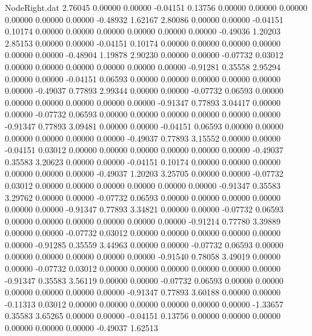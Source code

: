 \begin{filecontents}{NodeRight.dat}
   2.76045    0.00000    0.00000    -0.04151    0.13756    0.00000    0.00000    0.00000    0.00000    0.00000    0.00000   -0.48932    1.62167
   2.80086    0.00000    0.00000    -0.04151    0.10174    0.00000    0.00000    0.00000    0.00000    0.00000    0.00000   -0.49036    1.20203
   2.85153    0.00000    0.00000    -0.04151    0.10174    0.00000    0.00000    0.00000    0.00000    0.00000    0.00000   -0.48904    1.19878
   2.90230    0.00000    0.00000    -0.07732    0.03012    0.00000    0.00000    0.00000    0.00000    0.00000    0.00000   -0.91281    0.35558
   2.95294    0.00000    0.00000    -0.04151    0.06593    0.00000    0.00000    0.00000    0.00000    0.00000    0.00000   -0.49037    0.77893
   2.99344    0.00000    0.00000    -0.07732    0.06593    0.00000    0.00000    0.00000    0.00000    0.00000    0.00000   -0.91347    0.77893
   3.04417    0.00000    0.00000    -0.07732    0.06593    0.00000    0.00000    0.00000    0.00000    0.00000    0.00000   -0.91347    0.77893
   3.09481    0.00000    0.00000    -0.04151    0.06593    0.00000    0.00000    0.00000    0.00000    0.00000    0.00000   -0.49037    0.77893
   3.15552    0.00000    0.00000    -0.04151    0.03012    0.00000    0.00000    0.00000    0.00000    0.00000    0.00000   -0.49037    0.35583
   3.20623    0.00000    0.00000    -0.04151    0.10174    0.00000    0.00000    0.00000    0.00000    0.00000    0.00000   -0.49037    1.20203
   3.25705    0.00000    0.00000    -0.07732    0.03012    0.00000    0.00000    0.00000    0.00000    0.00000    0.00000   -0.91347    0.35583
   3.29762    0.00000    0.00000    -0.07732    0.06593    0.00000    0.00000    0.00000    0.00000    0.00000    0.00000   -0.91347    0.77893
   3.34821    0.00000    0.00000    -0.07732    0.06593    0.00000    0.00000    0.00000    0.00000    0.00000    0.00000   -0.91214    0.77780
   3.39889    0.00000    0.00000    -0.07732    0.03012    0.00000    0.00000    0.00000    0.00000    0.00000    0.00000   -0.91285    0.35559
   3.44963    0.00000    0.00000    -0.07732    0.06593    0.00000    0.00000    0.00000    0.00000    0.00000    0.00000   -0.91540    0.78058
   3.49019    0.00000    0.00000    -0.07732    0.03012    0.00000    0.00000    0.00000    0.00000    0.00000    0.00000   -0.91347    0.35583
   3.56119    0.00000    0.00000    -0.07732    0.06593    0.00000    0.00000    0.00000    0.00000    0.00000    0.00000   -0.91347    0.77893
   3.60188    0.00000    0.00000    -0.11313    0.03012    0.00000    0.00000    0.00000    0.00000    0.00000    0.00000   -1.33657    0.35583
   3.65265    0.00000    0.00000    -0.04151    0.13756    0.00000    0.00000    0.00000    0.00000    0.00000    0.00000   -0.49037    1.62513

\end{filecontents}
